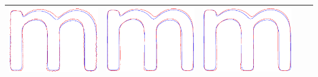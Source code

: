\documentclass[12pt]{article}
\begin{document}
\begin{center}
\begin{table}[h]
\begin{tabular}{|c|c|c|c|c|}
\includegraphics[scale = 0.2]{images/f2var1} &
\includegraphics[scale = 0.2]{images/f2var0_1} &
\includegraphics[scale = 0.2]{images/f2var0_01} \\ \hline

\end{tabular}
\end{table}
\end{center}
\end{document}
